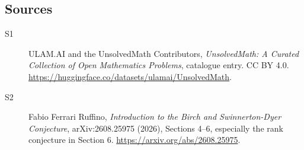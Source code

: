 \documentclass[11pt]{article}
\begin{document}
\subsection{Sources}
\begin{description}
\item[\hypertarget{source:statement:1}{S1}] ULAM.AI and the UnsolvedMath Contributors, \emph{UnsolvedMath: A Curated Collection of Open Mathematics Problems}, catalogue entry. CC BY 4.0. \url{https://huggingface.co/datasets/ulamai/UnsolvedMath}.
\item[\hypertarget{source:statement:2}{S2}] Fabio Ferrari Ruffino, \emph{Introduction to the Birch and Swinnerton-Dyer Conjecture}, arXiv:2608.25975 (2026), Sections 4--6, especially the rank conjecture in Section 6. \url{https://arxiv.org/abs/2608.25975}.
\end{description}
\label{end:statement}
\end{document}

